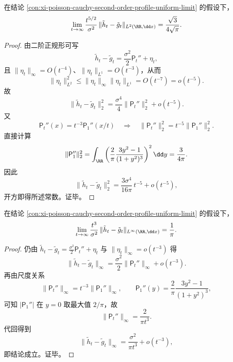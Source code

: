 

\begin{conclusion}\label{con:xi-poisson-cauchy-l2-sharp-independent}
在结论 \ref{con:xi-poisson-cauchy-second-order-profile-uniform-limit} 的假设下，
\[
\lim_{t\to\infty}\frac{t^{5/2}}{\sigma^2}\,
\|\tilde h_t-\tilde g_t\|_{L^2(\RR,\dd x)}
=\frac{\sqrt3}{4\sqrt\pi}.
\]
\end{conclusion}
\begin{proof}
由二阶正规形可写
\[
\tilde h_t-\tilde g_t=\frac{\sigma^2}{2}\mathsf P_t''+\eta_t,
\]
且 \(\|\eta_t\|_\infty=O(t^{-4})\)、\(\|\eta_t\|_{L^1}=O(t^{-3})\)，从而
\[
\|\eta_t\|_{L^2}^2\le \|\eta_t\|_\infty\|\eta_t\|_{L^1}=O(t^{-7})=o(t^{-5}).
\]
故
\[
\|\tilde h_t-\tilde g_t\|_2^2
=\frac{\sigma^4}{4}\|\mathsf P_t''\|_2^2+o(t^{-5}).
\]
又
\[
\mathsf P_t''(x)=t^{-3}\mathsf P_1''(x/t)
\quad\Longrightarrow\quad
\|\mathsf P_t''\|_2^2=t^{-5}\|\mathsf P_1''\|_2^2.
\]
直接计算
\[
\|\mathsf P_1''\|_2^2
=\int_{\RR}\left(\frac{2}{\pi}\frac{3y^2-1}{(1+y^2)^3}\right)^2\dd y
=\frac{3}{4\pi}.
\]
因此
\[
\|\tilde h_t-\tilde g_t\|_2^2
=\frac{3\sigma^4}{16\pi}\,t^{-5}+o(t^{-5}),
\]
开方即得所述常数。证毕。
\end{proof}

\begin{conclusion}\label{con:xi-poisson-cauchy-linf-sharp-independent}
在结论 \ref{con:xi-poisson-cauchy-second-order-profile-uniform-limit} 的假设下，
\[
\lim_{t\to\infty}\frac{t^{3}}{\sigma^2}\,
\|\tilde h_t-\tilde g_t\|_{L^\infty(\RR,\dd x)}
=\frac{1}{\pi}.
\]
\end{conclusion}
\begin{proof}
仍由
\(
\tilde h_t-\tilde g_t=\frac{\sigma^2}{2}\mathsf P_t''+\eta_t
\)
与 \(\|\eta_t\|_\infty=o(t^{-3})\) 得
\[
\|\tilde h_t-\tilde g_t\|_\infty
=\frac{\sigma^2}{2}\|\mathsf P_t''\|_\infty+o(t^{-3}).
\]
再由尺度关系
\[
\|\mathsf P_t''\|_\infty=t^{-3}\|\mathsf P_1''\|_\infty,\qquad
\mathsf P_1''(y)=\frac{2}{\pi}\frac{3y^2-1}{(1+y^2)^3},
\]
可知 \(|\mathsf P_1''|\) 在 \(y=0\) 取最大值 \(2/\pi\)，故
\[
\|\mathsf P_t''\|_\infty=\frac{2}{\pi t^3}.
\]
代回得到
\[
\|\tilde h_t-\tilde g_t\|_\infty
=\frac{\sigma^2}{\pi t^3}+o(t^{-3}),
\]
即结论成立。证毕。
\end{proof}


